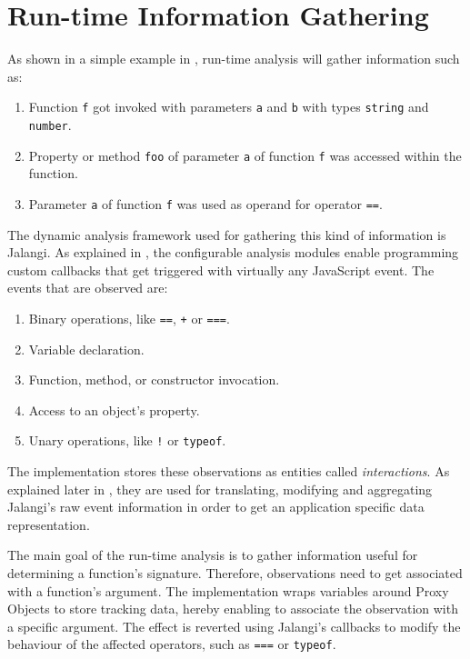 \section{Run-time Information Gathering} \label{run-time-information-gathering}
As shown in a simple example in , run-time analysis will gather information such as:

\begin{enumerate}
  \item Function \texttt{f} got invoked with parameters \texttt{a} and \texttt{b} with types \texttt{string} and \texttt{number}.
  \item Property or method \texttt{foo} of parameter \texttt{a} of function \texttt{f} was accessed within the function.
  \item Parameter \texttt{a} of function \texttt{f} was used as operand for operator \texttt{==}.
\end{enumerate}

The dynamic analysis framework used for gathering this kind of information is Jalangi. As explained in , the configurable analysis modules enable programming custom callbacks that get triggered with virtually any JavaScript event. The events that are observed are:
\begin{enumerate}
  \item Binary operations, like \texttt{==}, \texttt{+} or \texttt{===}.
  \item Variable declaration.
  \item Function, method, or constructor invocation.
  \item Access to an object's property.
  \item Unary operations, like \texttt{!} or \texttt{typeof}.
\end{enumerate}

The implementation stores these observations as entities called \textit{interactions}. As explained later in , they are used for translating, modifying and aggregating Jalangi's raw event information in order to get an application specific data representation.

The main goal of the run-time analysis is to gather information useful for determining a function's signature. Therefore, observations need to get associated with a function's argument. The implementation wraps variables around Proxy Objects to store tracking data, hereby enabling to associate the observation with a specific argument. The effect is reverted using Jalangi's callbacks to modify the behaviour of the affected operators, such as \texttt{===} or \texttt{typeof}.

